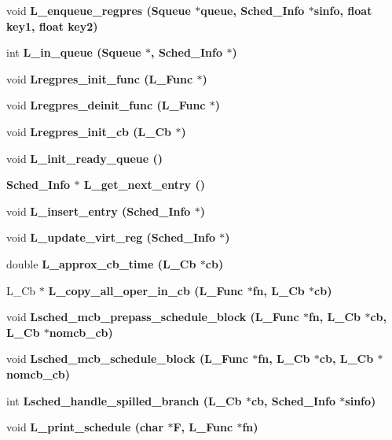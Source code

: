 \begin{CompactItemize}
void \bf{L\_\-enqueue\_\-regpres} (\bf{Squeue} $\ast$queue, \bf{Sched\_\-Info} $\ast$sinfo, float key1, float key2)
\item 
int \bf{L\_\-in\_\-queue} (\bf{Squeue} $\ast$, \bf{Sched\_\-Info} $\ast$)
\item 
void \bf{Lregpres\_\-init\_\-func} (L\_\-Func $\ast$)
\item 
void \bf{Lregpres\_\-deinit\_\-func} (L\_\-Func $\ast$)
\item 
void \bf{Lregpres\_\-init\_\-cb} (L\_\-Cb $\ast$)
\item 
void \bf{L\_\-init\_\-ready\_\-queue} ()
\item 
\bf{Sched\_\-Info} $\ast$ \bf{L\_\-get\_\-next\_\-entry} ()
\item 
void \bf{L\_\-insert\_\-entry} (\bf{Sched\_\-Info} $\ast$)
\item 
void \bf{L\_\-update\_\-virt\_\-reg} (\bf{Sched\_\-Info} $\ast$)
\item 
double \bf{L\_\-approx\_\-cb\_\-time} (L\_\-Cb $\ast$cb)
\item 
L\_\-Cb $\ast$ \bf{L\_\-copy\_\-all\_\-oper\_\-in\_\-cb} (L\_\-Func $\ast$fn, L\_\-Cb $\ast$cb)
\item 
void \bf{Lsched\_\-mcb\_\-prepass\_\-schedule\_\-block} (L\_\-Func $\ast$fn, L\_\-Cb $\ast$cb, L\_\-Cb $\ast$nomcb\_\-cb)
\item 
void \bf{Lsched\_\-mcb\_\-schedule\_\-block} (L\_\-Func $\ast$fn, L\_\-Cb $\ast$cb, L\_\-Cb $\ast$nomcb\_\-cb)
\item 
int \bf{Lsched\_\-handle\_\-spilled\_\-branch} (L\_\-Cb $\ast$cb, \bf{Sched\_\-Info} $\ast$sinfo)
\item 
void \bf{L\_\-print\_\-schedule} (char $\ast$\bf{F}, L\_\-Func $\ast$fn)
\end{CompactItemize}
